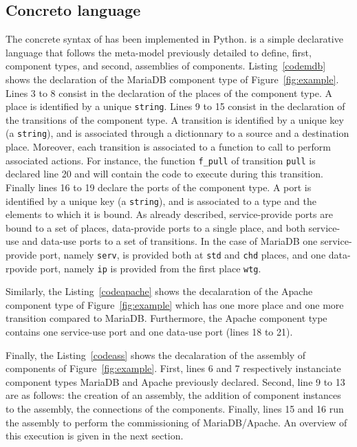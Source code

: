 \subsection{Concreto language}


The concrete syntax of \mad has been implemented in Python. \mad
is a simple declarative language that follows the meta-model
previously detailed to define, first, component types, and second,
assemblies of components. Listing~\ref{codemdb} shows the declaration
of the MariaDB component type of Figure~\ref{fig:example}. Lines 3 to
8 consist in the declaration of the places of the component type. A
place is identified by a unique \texttt{string}. Lines 9 to 15 consist
in the declaration of the transitions of the component type. A
transition is identified by a unique key (a \texttt{string}), and is
associated through a dictionnary to a source and a destination
place. Moreover, each transition is associated to a function to call
to perform associated actions. For instance, the function
\texttt{f\_pull} of transition \texttt{pull} is declared line 20 and
will contain the code to execute during this transition. Finally lines
16 to 19 declare the ports of the component type. A port is identified
by a unique key (a \texttt{string}), and is associated to a type and
the elements to which it is bound. As already described,
service-provide ports are bound to a set of places, data-provide ports
to a single place, and both service-use and data-use ports to a set of
transitions. In the case of MariaDB one service-provide port, namely
\texttt{serv}, is provided both at \texttt{std} and \texttt{chd}
places, and one data-rpovide port, namely \texttt{ip} is provided from
the first place \texttt{wtg}.



Similarly, the Listing~\ref{codeapache} shows the decalaration of the
Apache component type of Figure~\ref{fig:example} which has one more place
and one more transition compared to MariaDB. Furthermore, the Apache
component type contains one service-use port and one data-use port
(lines 18 to 21).



Finally, the Listing~\ref{codeass} shows the decalaration of the
assembly of components of Figure~\ref{fig:example}. First, lines 6 and
7 respectively instanciate component types MariaDB and Apache
previously declared. Second, line 9 to 13 are as follows: the creation
of an assembly, the addition of component instances to the assembly,
the connections of the components. Finally, lines 15 and 16 run the
assembly to perform the commissioning of MariaDB/Apache. An overview
of this execution is given in the next section.

